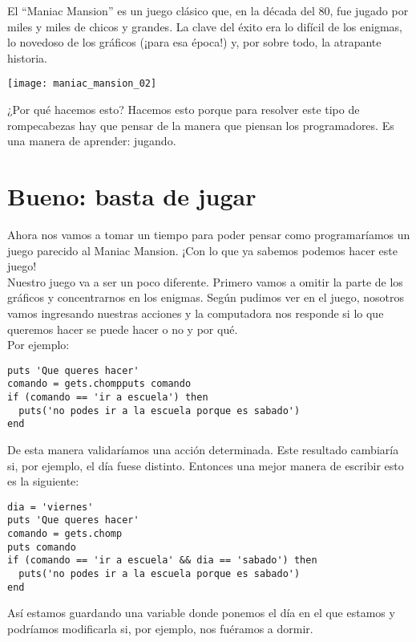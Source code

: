 El “Maniac Mansion” es un juego clásico que, en la década del 80, fue jugado por miles y miles de chicos y grandes. La clave del éxito era lo difícil de los enigmas, lo novedoso de los gráficos (¡para esa época!) y, por sobre todo, la atrapante historia.

\begin{center}
  \texttt{[image: maniac\_mansion\_02]}
\end{center}

¿Por qué hacemos esto? Hacemos esto porque para resolver este tipo de rompecabezas hay que pensar de la manera que piensan los programadores. Es una manera de aprender: jugando.

\section{Bueno: basta de jugar}
Ahora nos vamos a tomar un tiempo para poder pensar como programaríamos un juego parecido al Maniac Mansion.  ¡Con lo que ya sabemos podemos hacer este juego!\\

Nuestro juego va a ser un poco diferente. Primero vamos a omitir la parte de los gráficos y concentrarnos en los enigmas. Según pudimos ver en el juego, nosotros vamos ingresando nuestras acciones y la computadora nos responde si lo que queremos hacer se puede hacer o no y por qué.\\

Por ejemplo: 
\begin{lstlisting}
puts 'Que queres hacer'
comando = gets.chompputs comando
if (comando == 'ir a escuela') then
  puts('no podes ir a la escuela porque es sabado')
end
\end{lstlisting}

De esta manera validaríamos una acción determinada. Este resultado cambiaría si, por ejemplo, el día fuese distinto. Entonces una mejor manera de escribir esto es la siguiente:

\begin{lstlisting}
dia = 'viernes'
puts 'Que queres hacer'
comando = gets.chomp
puts comando
if (comando == 'ir a escuela' && dia == 'sabado') then
  puts('no podes ir a la escuela porque es sabado')
end
\end{lstlisting}

Así estamos guardando una variable donde ponemos el día en el que estamos y podríamos modificarla si, por ejemplo, nos fuéramos a dormir.